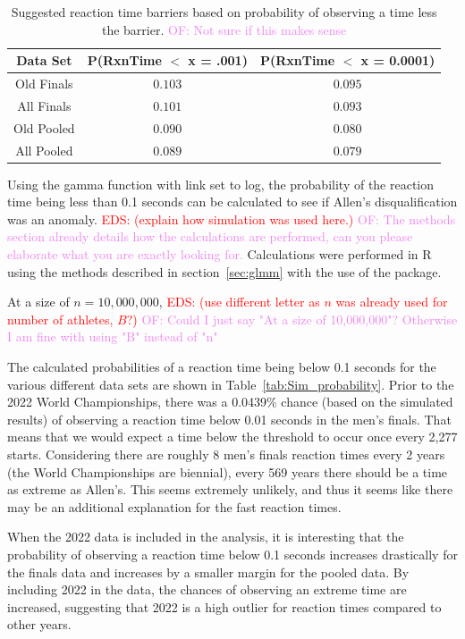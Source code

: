 \documentclass[12pt, letterpaper, titlepage]{article}
\newcommand{\eds}[1]{\textcolor{red}{EDS: (#1)}}
\newcommand{\of}[1]{\textcolor{violet}{OF: #1}}
\begin{document}
\begin{table}
  \centering
  \caption{Suggested reaction time barriers based on probability of observing
  a time less the barrier. \of{Not sure if this makes sense}}
  \begin{tabular}{c c c} 
   \toprule
   Data Set & P(RxnTime $<$ x = .001) & P(RxnTime $<$ x = 0.0001) \\ 
   \midrule
   Old Finals & $0.103$ & $0.095$ \\
   All Finals & $0.101$ & $0.093$ \\
   Old Pooled & $0.090$ & $0.080$ \\ 
   All Pooled & $0.089$ & $0.079$ \\
   \bottomrule
  \end{tabular}
  \label{tab:Sim_time}
\end{table}


Using the gamma function with link set to log, the probability of the reaction 
time being less than 0.1 seconds can be calculated to see if Allen's 
disqualification was an anomaly. 
\eds{explain how simulation was used here.} \of{The methods section already
details how the calculations are performed, can you please elaborate what you
are exactly looking for.}
Calculations were performed in R using the methods described in 
section~\ref{sec:glmm} with the use of the \citet{lme4} package.


At a size of $n=10,000,000$, \eds{use different letter as $n$ was already used 
for number of athletes, $B?$} \of{Could I just say "At a size of 10,000,000"? 
Otherwise I am fine with using "B" instead of "n"}


The calculated probabilities of a reaction time 
being below 0.1 seconds for the various different data sets are shown in 
Table~\ref{tab:Sim_probability}. Prior to the 2022 World Championships, there was 
a 0.0439\% chance (based on the
simulated results) of observing a reaction time below 0.01 seconds in the men's
finals.
That means that we would expect a time below the threshold to occur
once every 2,277 starts.  Considering there are roughly 8 men's finals reaction
times every 2 years (the World Championships are biennial), every 569 years there
should be a time as extreme as Allen's. This seems extremely unlikely, and thus
it seems like there may be an additional explanation for the fast reaction times.


When the 2022 data is included in the analysis, it is interesting that the 
probability of observing a reaction time below 0.1 seconds increases drastically 
for the finals data and increases by a smaller margin for the pooled data.  By
including 2022 in the data, the chances of observing an extreme time are 
increased, suggesting that 2022 is a high outlier for reaction times compared to
 other years.
\end{document}
